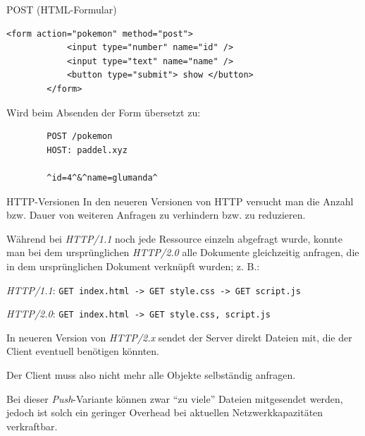 \begin{example}{POST (HTML-Formular)}
    \begin{lstlisting}[language=HTML5]
        <form action="pokemon" method="post">
            <input type="number" name="id" />
            <input type="text" name="name" />
            <button type="submit"> show </button>
        </form>
    \end{lstlisting}

    Wird beim Absenden der Form übersetzt zu:

    \begin{lstlisting}
        POST /pokemon
        HOST: paddel.xyz

        ^id=4^&^name=glumanda^
    \end{lstlisting}
\end{example}

\begin{bonus}{HTTP-Versionen}
    In den neueren Versionen von HTTP versucht man die Anzahl bzw. Dauer von weiteren Anfragen zu verhindern bzw. zu reduzieren.

    Während bei \emph{HTTP/1.1} noch jede Ressource einzeln abgefragt wurde, konnte man bei dem ursprünglichen \emph{HTTP/2.0} alle Dokumente gleichzeitig anfragen, die in dem ursprünglichen Dokument verknüpft wurden; z. B.:

    \emph{HTTP/1.1}: \texttt{GET index.html -> GET style.css -> GET script.js}

    \emph{HTTP/2.0}: \texttt{GET index.html -> GET style.css,  script.js}

    In neueren Version von \emph{HTTP/2.x} sendet der Server direkt Dateien mit, die der Client eventuell benötigen könnten.

    Der Client muss also nicht mehr alle Objekte selbständig anfragen.

    Bei dieser \emph{Push}-Variante können zwar \enquote{zu viele} Dateien mitgesendet werden, jedoch ist solch ein geringer Overhead bei aktuellen Netzwerkkapazitäten verkraftbar.
\end{bonus}